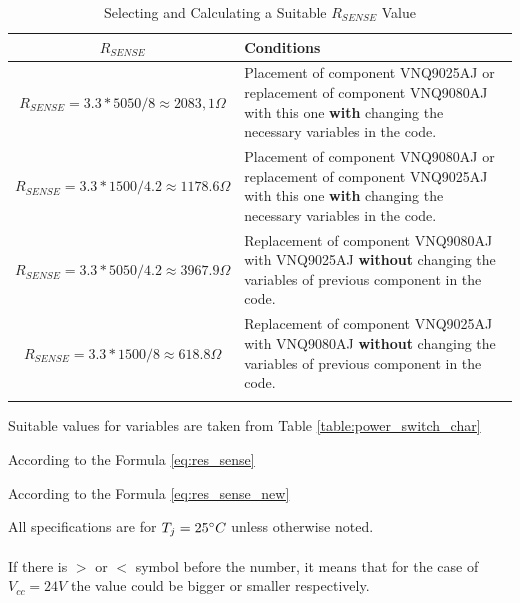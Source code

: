 \documentclass[10pt]{datasheet}
\begin{document}
\begin{table}[H]
\begin{threeparttable}
\caption{Selecting and Calculating a Suitable $R_{SENSE}$ Value}
\label{table:power_switch_pins}
\begin{tabularx}{\textwidth}{ c | X }
    \thickhline
    \textbf{$R_{SENSE}$\tnote{1}} & \textbf{Conditions}\\
    \hline
    $R_{SENSE}=3.3*5050/8\approx2083,1\Omega$\tnote{2} & Placement of component VNQ9025AJ\cite{ref16} or replacement of component VNQ9080AJ\cite{ref11} with this one \textbf{with} changing the necessary variables in the code.\\
    \hline
    $R_{SENSE}=3.3*1500/4.2\approx1178.6\Omega$\tnote{2} & Placement of component VNQ9080AJ\cite{ref16} or replacement of component VNQ9025AJ\cite{ref11} with this one \textbf{with} changing the necessary variables in the code.\\
    \hline
    $R_{SENSE}=3.3*5050/4.2\approx3967.9\Omega$\tnote{3} & Replacement of component VNQ9080AJ\cite{ref11} with VNQ9025AJ\cite{ref16} \textbf{without} changing the variables of previous component in the code.\\
    \hline
    $R_{SENSE}=3.3*1500/8\approx618.8\Omega$\tnote{3} & Replacement of component VNQ9025AJ\cite{ref11} with VNQ9080AJ\cite{ref16} \textbf{without} changing the variables of previous component in the code.\\
    \hline
    \thickhline
\end{tabularx}
\begin{tablenotes}
\item[1] {Suitable values for variables are taken from Table \ref{table:power_switch_char}}
\item[2] {According to the Formula \ref{eq:res_sense}}
\item[3] {According to the Formula \ref{eq:res_sense_new}}
\end{tablenotes}
\end{threeparttable}
\end{table}
\newpage
All specifications are for $T_j = 25\degree C$ unless otherwise noted.\\\\
If there is $>$ or $<$ symbol before the number, it means that for the case of $V_{cc}=24V$ the value could be bigger or smaller respectively.
\end{document}
